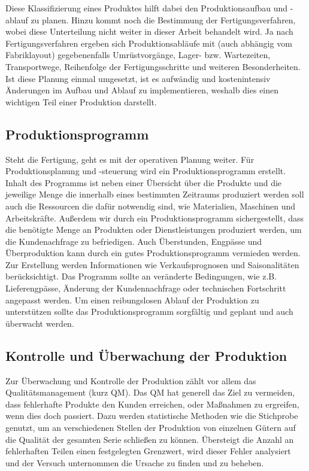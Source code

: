\documentclass[a4paper,12pt, german]{report}
\begin{document}
Diese Klassifizierung eines Produktes hilft dabei den Produktionsaufbau und -ablauf zu planen. Hinzu kommt noch die Bestimmung der Fertigungsverfahren, wobei diese Unterteilung nicht weiter in dieser Arbeit behandelt wird. Ja nach Fertigungsverfahren ergeben sich Produktionsabläufe mit (auch abhängig vom Fabriklayout) gegebenenfalls Umrüstvorgänge, Lager- bzw. Wartezeiten, Transportwege, Reihenfolge der Fertigungsschritte und weiteren Besonderheiten. Ist diese Planung einmal umgesetzt, ist es aufwändig und kostenintensiv Änderungen im Aufbau und Ablauf zu implementieren, weshalb dies einen wichtigen Teil einer Produktion darstellt. \cite{07}

\subsection{Produktionsprogramm}

Steht die Fertigung, geht es mit der operativen Planung weiter. Für Produktionsplanung und -steuerung wird ein Produktionsprogramm erstellt. Inhalt des Programms ist neben einer Übersicht über die Produkte und die jeweilige Menge die innerhalb eines bestimmten Zeitraums produziert werden soll auch die Ressourcen die dafür notwendig sind, wie Materialien, Maschinen und Arbeitskräfte. Außerdem wir durch ein Produktionsprogramm sichergestellt, dass die benötigte Menge an Produkten oder Dienstleistungen produziert werden, um die Kundenachfrage zu befriedigen. Auch Überstunden, Engpässe und Überproduktion kann durch ein gutes Produktionsprogramm vermieden werden. Zur Erstellung werden Informationen wie Verkaufsprognosen und Saisonalitäten berücksichtigt. Das Programm sollte an veränderte Bedingungen, wie z.B. Lieferengpässe, Änderung der Kundennachfrage oder technischen Fortschritt angepasst werden. Um einen reibungslosen Ablauf der Produktion zu unterstützen sollte das Produktionsprogramm sorgfältig und geplant und auch überwacht werden. \cite{07}

\subsection{Kontrolle und Überwachung der Produktion}

Zur Überwachung und Kontrolle der Produktion zählt vor allem das Qualitätsmanagement (kurz QM). Das QM hat generell das Ziel zu vermeiden, dass fehlerhafte Produkte den Kunden erreichen, oder Maßnahmen zu ergreifen, wenn dies doch passiert. Dazu werden statistische Methoden wie die Stichprobe genutzt, um an verschiedenen Stellen der Produktion von einzelnen Gütern auf die Qualität der gesamten Serie schließen zu können. Übersteigt die Anzahl an fehlerhaften Teilen einen festgelegten Grenzwert, wird dieser Fehler analysiert und der Versuch unternommen die Ursache zu finden und zu beheben. \cite{07}
\end{document}
